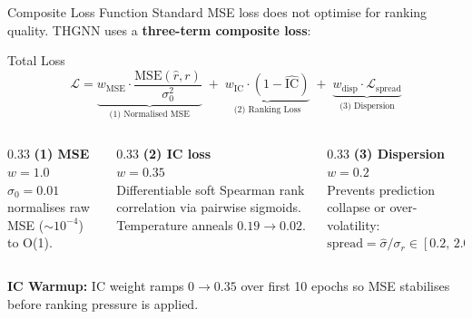 \documentclass[aspectratio=169, 10pt]{beamer}
\begin{document}
\begin{frame}{Composite Loss Function}
  Standard MSE loss does not optimise for ranking quality.
  THGNN uses a \textbf{three-term composite loss}:

  \begin{block}{Total Loss}
    \vspace{-0.3em}
    \[
      \mathcal{L} = \underbrace{w_\text{MSE}
        \cdot \frac{\text{MSE}(\hat{r}, r)}{\sigma_0^2}}_{\text{(1) Normalised MSE}}
      \;+\;\underbrace{w_\text{IC} \cdot (1 - \widehat{\text{IC}})}_{\text{(2) Ranking Loss}}
      \;+\;\underbrace{w_\text{disp} \cdot \mathcal{L}_\text{spread}}_{\text{(3) Dispersion}}
    \]
  \end{block}

  \begin{columns}[T]
    \begin{column}{0.33\textwidth}
      \textbf{(1) MSE}\\$w=1.0$\\
      $\sigma_0 = 0.01$ normalises raw MSE ($\sim10^{-4}$) to O(1).
    \end{column}
    \begin{column}{0.33\textwidth}
      \textbf{(2) IC loss}\\$w=0.35$\\
      Differentiable soft Spearman rank correlation via pairwise sigmoids.
      Temperature anneals $0.19 \to 0.02$.
    \end{column}
    \begin{column}{0.33\textwidth}
      \textbf{(3) Dispersion}\\$w=0.2$\\
      Prevents prediction collapse or over-volatility:
      $\text{spread} = \hat{\sigma}/\sigma_r \in [0.2,\,2.0]$
    \end{column}
  \end{columns}

  \vspace{0.4cm}
  \textbf{IC Warmup:} IC weight ramps $0 \to 0.35$ over first 10 epochs so MSE stabilises before ranking pressure is applied.
\end{frame}
\end{document}

